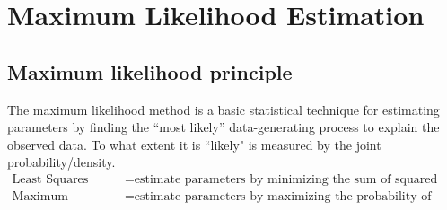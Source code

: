 \documentclass[10.5pt, A4paper, openany, uplatex]{book}
\numberwithin{equation}{section}
\begin{document}

\chapter{Maximum Likelihood Estimation}\label{chap:mle}
\section{Maximum likelihood principle}
The maximum likelihood method is a basic statistical technique for estimating parameters by finding the ``most likely'' data-generating process to explain the observed data.
To what extent it is ``likely" is measured by the joint probability/density. 
\begin{align*}
\text{Least Squares} &= \text{estimate parameters by minimizing the sum of squared errors}\\
\text{Maximum Likelihood} &= \text{estimate parameters by maximizing the probability of observing the data}
\end{align*}
\end{document}
